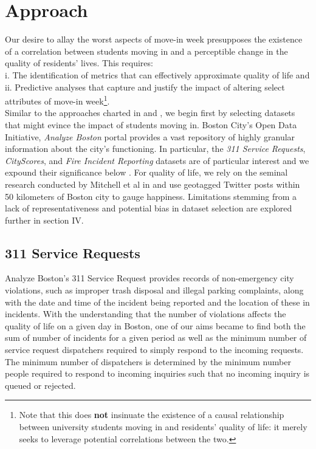 \documentclass[journal, a4paper]{IEEEtran}
\begin{document}
\section{Approach}
Our desire to allay the worst aspects of move-in week presupposes the existence of a correlation between students moving in and a perceptible change in the quality of residents' lives. This requires: 
\\ \null \quad\quad i. The identification of metrics that can effectively approximate quality of life and
\\\null\quad\quad ii. Predictive analyses that capture and justify the impact of altering select attributes of move-in week\footnote{Note that this does \textbf{not} insinuate the existence of a causal relationship between university students moving in and residents' quality of life: it merely seeks to leverage potential correlations between the two.}.
\\Similar to the approaches charted in \cite{happytext} and \cite{trashcity}, we begin first by selecting datasets that might evince the impact of students moving in. Boston City's Open Data Initiative, \textit{Analyze Boston} portal provides a vast repository of highly granular information about the city's functioning. In particular, the \textit{311 Service Requests}, \textit{CityScores}, and \textit{Fire Incident Reporting} datasets are of particular interest and we expound their significance below \cite{bosdatalink}. For quality of life, we rely on the seminal research conducted by Mitchell et al in \cite{happytexttwitter} and use geotagged Twitter posts within 50 kilometers of Boston city to gauge happiness. Limitations stemming from a lack of representativeness and potential bias in dataset selection are explored further in section IV.

\subsection{311 Service Requests} 
\tab Analyze Boston’s 311 Service Request provides records of non-emergency city
violations, such as improper trash disposal and illegal parking complaints, along
with the date and time of the incident being reported and the location of these in
incidents. With the understanding that the number of violations affects the quality
of life on a given day in Boston, one of our aims became to find both the sum of
number of incidents for a given period as well as the minimum number of service
request dispatchers required to simply respond to the incoming requests. The
minimum number of dispatchers is determined by the minimum number people
required to respond to incoming inquiries such that no incoming inquiry is queued
or rejected.
\end{document}
